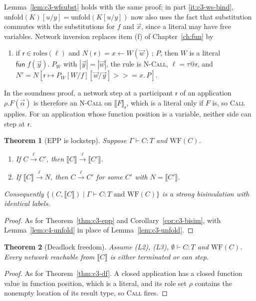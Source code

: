\documentclass[11pt]{report}
\makeatletter
\theoremstyle{plain}
\newtheorem{theorem}{Theorem}[chapter]
\theoremstyle{definition}
\theoremstyle{remark}
\newcommand{\kw}[1]{\mathsf{#1}}
\newcommand{\rr}{\mathsf{r}}
\newcommand{\mbind}[3]{#1 \mathbin{>\!\!>\!\!=} #2.\,#3}
\newcommand{\unfold}[1]{\mathrm{unfold}(#1)}
\newcommand{\roles}[1]{\mathrm{roles}(#1)}
\newcommand{\WF}{\mathrm{WF}}
\newcommand{\tauat}[1]{\tau\mathord{@}#1}
\newcommand{\lto}[1]{\xrightarrow{\;#1\;}}
\newcommand{\upd}[3]{#1[#2 \mapsto #3]}
\newcommand{\nfun}[3]{\kw{fun}\;#1(#2).\;#3}
\newcommand{\proj}[2]{\llbracket #1 \rrbracket_{#2}}
\newcommand{\projn}[1]{\llbracket #1 \rrbracket}
\newcommand{\rn}[1]{{\normalfont\scshape #1}}
\makeatother
\begin{document}
Lemma~\ref{lem:c3-wfsubst} holds with the same proof; in part
\ref{it:c3-ws-bind}, $\unfold{K}[u/y]=\unfold{K[u/y]}$ now also uses the fact
that substitution commutes with the substitutions for $f$ and $\vec x$, since
a literal may have free variables.  Network inversion replaces item (f)
of Chapter~\ref{ch:fun} by
\begin{enumerate}[label=(\alph*),start=6,nosep]
\item if $\rr\in\roles{\ell}$ and $N(\rr)=x\leftarrow W(\vec w)\,;\,P$, then
  $W$ is a literal $\nfun{f}{\vec y}{P_W}$ with $|\vec y|=|\vec w|$, the rule is
  \rn{N-Call}, $\ell=\tauat{\rr}$, and
  $N'=\upd{N}{\rr}{\mbind{P_W[W/f][\vec w/\vec y]}{x}{P}}$.
\end{enumerate}
In the soundness proof, a network step at a participant $\rr$ of an
application $\rho.F(\vec\alpha)$ is therefore an \rn{N-Call} on
$\proj{F}{\rr}$, which is a literal only if $F$ is, so \rn{Call} applies.  For
an application whose function position is a variable, neither side can step
at $\rr$.

\begin{theorem}[EPP is lockstep]\label{thm:c4-epp}
  Suppose $\Gamma\vdash C:T$ and $\WF(C)$.
  \begin{enumerate}[label=(\arabic*),nosep]
  \item If $C\lto{\ell}C'$, then $\projn{C}\lto{\ell}\projn{C'}$.
  \item If $\projn{C}\lto{\ell}N$, then $C\lto{\ell}C'$ for some $C'$ with $N=\projn{C'}$.
  \end{enumerate}
  Consequently $\{(C,\projn{C})\mid\Gamma\vdash C:T\text{ and }\WF(C)\}$ is a
  strong bisimulation with identical labels.
\end{theorem}
\begin{proof}
  As for Theorem~\ref{thm:c3-epp} and Corollary~\ref{cor:c3-bisim}, with
  Lemma~\ref{lem:c4-unfold} in place of Lemma~\ref{lem:c3-unfold}.
\end{proof}

\begin{theorem}[Deadlock freedom]\label{thm:c4-df}
  Assume (L2), (L3), $\emptyset\vdash C:T$ and $\WF(C)$.  Every network
  reachable from $\projn{C}$ is either terminated or can step.
\end{theorem}
\begin{proof}
  As for Theorem~\ref{thm:c3-df}.  A closed application has a closed function
  value in function position, which is a literal, and its role set $\rho$
  contains the nonempty location of its result type, so \rn{Call} fires.
\end{proof}
\end{document}
